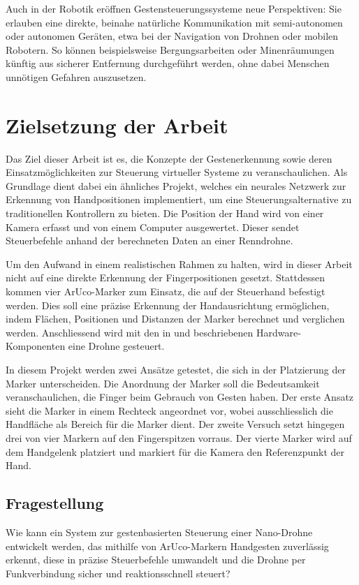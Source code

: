 Auch in der Robotik eröffnen Gestensteuerungssysteme neue Perspektiven: Sie erlauben eine direkte, beinahe natürliche Kommunikation mit semi-autonomen oder autonomen Geräten, etwa bei der Navigation von Drohnen oder mobilen Robotern.
So können beispielsweise Bergungsarbeiten oder Minenräumungen künftig aus sicherer Entfernung durchgeführt werden, ohne dabei Menschen unnötigen Gefahren auszusetzen.

\section{Zielsetzung der Arbeit}
Das Ziel dieser Arbeit ist es, die Konzepte der Gestenerkennung sowie deren Einsatzmöglichkeiten zur Steuerung virtueller Systeme zu veranschaulichen.
Als Grundlage dient dabei ein ähnliches Projekt, welches ein neurales Netzwerk zur Erkennung von Handpositionen implementiert, um eine Steuerungsalternative zu traditionellen Kontrollern zu bieten.
Die Position der Hand wird von einer Kamera erfasst und von einem Computer ausgewertet.
Dieser sendet Steuerbefehle anhand der berechneten Daten an einer Renndrohne.\cite{arxiv:OmniRace}

Um den Aufwand in einem realistischen Rahmen zu halten, wird in dieser Arbeit nicht auf eine direkte Erkennung der Fingerpositionen gesetzt.
Stattdessen kommen vier ArUco-Marker zum Einsatz, die auf der Steuerhand befestigt werden.
Dies soll eine präzise Erkennung der Handausrichtung ermöglichen, indem Flächen, Positionen und Distanzen der Marker berechnet und verglichen werden.
Anschliessend wird mit den in  und  beschriebenen Hardware-Komponenten eine Drohne gesteuert.

In diesem Projekt werden zwei Ansätze getestet, die sich in der Platzierung der Marker unterscheiden.
Die Anordnung der Marker soll die Bedeutsamkeit veranschaulichen, die Finger beim Gebrauch von Gesten haben.
Der erste Ansatz sieht die Marker in einem Rechteck angeordnet vor, wobei ausschliesslich die Handfläche als Bereich für die Marker dient.
Der zweite Versuch setzt hingegen drei von vier Markern auf den Fingerspitzen vorraus.
Der vierte Marker wird auf dem Handgelenk platziert und markiert für die Kamera den Referenzpunkt der Hand.

\subsection{Fragestellung}
Wie kann ein System zur gestenbasierten Steuerung einer Nano-Drohne entwickelt werden, das mithilfe von ArUco-Markern Handgesten zuverlässig erkennt, diese in präzise Steuerbefehle umwandelt und die Drohne per  Funkverbindung sicher und reaktionsschnell steuert?

